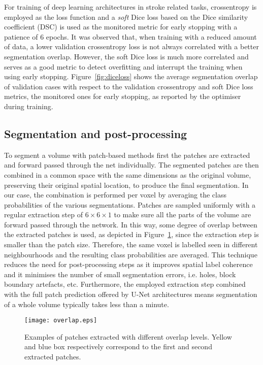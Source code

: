 \documentclass[letterpaper,final,authoryear,3p,times,twocolumn]{elsarticle}
\begin{document}
For training of deep learning architectures in stroke related tasks, crossentropy is employed as the loss function and a \textit{soft} Dice loss \citep{Sudre} based on the Dice similarity coefficient (DSC) is used as the monitored metric for early stopping with a patience of 6 epochs. It was observed that, when training with a reduced amount of data, a lower validation crossentropy loss is not always correlated with a better segmentation overlap. However, the soft Dice loss is much more correlated and serves as a good metric to detect overfitting and interrupt the training when using early stopping. Figure~\ref{fig:diceloss} shows the average segmentation overlap of validation cases with respect to the validation crossentropy and soft Dice loss metrics, the monitored ones for early stopping, as reported by the optimiser during training. 

\subsection{Segmentation and post-processing}

To segment a volume with patch-based methods first the patches are extracted and forward passed through the net individually. The segmented patches are then combined in a common space with the same dimensions as the original volume, preserving their original spatial location, to produce the final segmentation. In our case, the combination is performed per voxel by averaging the class probabilities of the various segmentations. Patches are sampled uniformly with a regular extraction step of $6 \times 6 \times 1$ to make sure all the parts of the volume are forward passed through the network. In this way, some degree of overlap between the extracted patches is used, as depicted in Figure~\ref{fig:overlap}, since the extraction step is smaller than the patch size. Therefore, the same voxel is labelled seen in different neighbourhoods and the resulting class probabilities are averaged. This technique reduces the need for post-processing steps as it improves spatial label coherence and it minimises the number of small segmentation errors, i.e. holes, block boundary artefacts, etc. Furthermore, the employed extraction step combined with the full patch prediction offered by U-Net architectures means segmentation of a whole volume typically takes less than a minute. 

\begin{figure}
	\centering
	\texttt{[image: overlap.eps]}
	\caption[Examples of patches extracted with different overlap levels.]{Examples of patches extracted with different overlap levels. Yellow and blue box respectively correspond to the first and second extracted patches.}
	\label{fig:overlap}
\end{figure}
\end{document}
